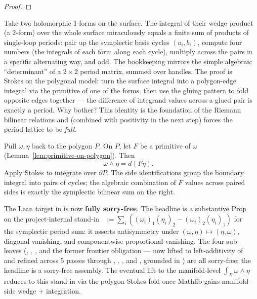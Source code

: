 \begin{proof}\leanok\end{proof}

\begin{layman}
Take two holomorphic 1-forms on the surface. The integral of their
wedge product (a 2-form) over the whole surface miraculously equals a
finite sum of products of single-loop periods: pair up the symplectic
basis cycles \((a_i, b_i)\), compute four numbers (the integrals of
each form along each cycle), multiply across the pairs in a specific
alternating way, and add. The bookkeeping mirrors the simple algebraic
``determinant'' of a \(2 \times 2\) period matrix, summed over handles.
The proof is Stokes on the polygonal model: turn the surface integral
into a polygon-edge integral via the primitive of one of the forms,
then use the gluing pattern to fold opposite edges together --- the
difference of integrand values across a glued pair is exactly a
period. Why bother? This identity is the foundation of the Riemann
bilinear relations and (combined with positivity in the next step)
forces the period lattice to be \emph{full}.
\end{layman}

\begin{proofsketch}
Pull \(\omega,\eta\) back to the polygon \(P\). On \(P\), let \(F\) be a
primitive of \(\omega\) (Lemma~\ref{lem:primitive-on-polygon}). Then
\[
  \omega\wedge\eta = d(F\eta).
\]
Apply Stokes to integrate over \(\partial P\). The side identifications
group the boundary integral into pairs of cycles; the algebraic
combination of \(F\) values across paired sides is exactly the symplectic
bilinear sum on the right.

The Lean target in
 is now
\textbf{fully sorry-free}. The headline
 is a substantive Prop on the
project-internal stand-in \,
\(:= \sum_i ((\omega_i)_1(\eta_i)_2 - (\omega_i)_2(\eta_i)_1)\) for
the symplectic period sum: it asserts antisymmetry under
\((\omega,\eta)\mapsto(\eta,\omega)\), diagonal vanishing, and
componentwise-proportional vanishing. The four sub-leaves
(,
,
, and the former frontier
obligation  --- now lifted to
left-additivity of  and refined across
5 passes through ,
,
, and
, grounded in
) are all sorry-free; the headline is
a sorry-free assembly. The eventual lift to the manifold-level
\(\int_X\omega\wedge\eta\) reduces to this stand-in via the polygon
Stokes fold once Mathlib gains manifold-side wedge + integration.
\end{proofsketch}


